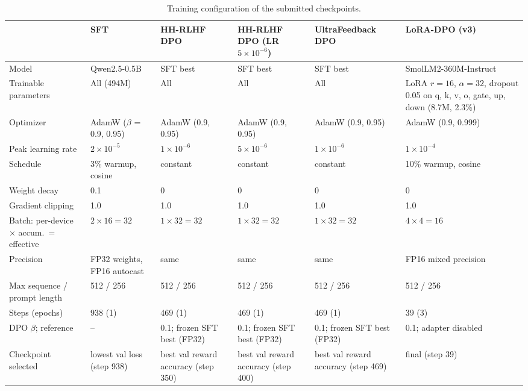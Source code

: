 \documentclass[10pt,a4paper]{article}
\begin{document}
\begin{table}[!htb]
\centering\small
\caption{Training configuration of the submitted checkpoints.}
\label{tab:config}
\begin{tabularx}{\textwidth}{@{}p{2.9cm}YYYYY@{}}
\toprule
 & SFT & HH-RLHF DPO & HH-RLHF DPO (LR $5\times10^{-6}$) & UltraFeedback DPO & LoRA-DPO (v3) \\
\midrule
Model & Qwen2.5-0.5B & SFT best & SFT best & SFT best & SmolLM2-360M-Instruct \\
Trainable parameters & All (494M) & All & All & All & LoRA $r{=}16$, $\alpha{=}32$, dropout 0.05 on q, k, v, o, gate, up, down (8.7M, 2.3\%) \\
Optimizer & AdamW ($\beta$ = 0.9, 0.95) & AdamW (0.9, 0.95) & AdamW (0.9, 0.95) & AdamW (0.9, 0.95) & AdamW (0.9, 0.999) \\
Peak learning rate & $2\times10^{-5}$ & $1\times10^{-6}$ & $5\times10^{-6}$ & $1\times10^{-6}$ & $1\times10^{-4}$ \\
Schedule & 3\% warmup, cosine & constant & constant & constant & 10\% warmup, cosine \\
Weight decay & 0.1 & 0 & 0 & 0 & 0 \\
Gradient clipping & 1.0 & 1.0 & 1.0 & 1.0 & 1.0 \\
Batch: per-device $\times$ accum.\ = effective & $2\times16=32$ & $1\times32=32$ & $1\times32=32$ & $1\times32=32$ & $4\times4=16$ \\
Precision & FP32 weights, FP16 autocast & same & same & same & FP16 mixed precision \\
Max sequence / prompt length & 512 / 256 & 512 / 256 & 512 / 256 & 512 / 256 & 512 / 256 \\
Steps (epochs) & 938 (1) & 469 (1) & 469 (1) & 469 (1) & 39 (3) \\
DPO $\beta$; reference & -- & 0.1; frozen SFT best (FP32) & 0.1; frozen SFT best (FP32) & 0.1; frozen SFT best (FP32) & 0.1; adapter disabled \\
Checkpoint selected & lowest val loss (step 938) & best val reward accuracy (step 350) & best val reward accuracy (step 400) & best val reward accuracy (step 469) & final (step 39) \\
\bottomrule
\end{tabularx}
\end{table}
\end{document}
